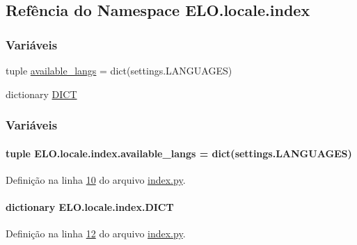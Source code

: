 \hypertarget{namespaceELO_1_1locale_1_1index}{}\subsection{Refência do Namespace E\+L\+O.\+locale.\+index}
\label{namespaceELO_1_1locale_1_1index}
\subsubsection*{Variáveis}
\begin{DoxyCompactItemize}
\item 
tuple \hyperlink{namespaceELO_1_1locale_1_1index_ab62adb4738ab68b1693adb90951d92a9}{available\+\_\+langs} = dict(settings.\+L\+A\+N\+G\+U\+A\+G\+E\+S)
\item 
dictionary \hyperlink{namespaceELO_1_1locale_1_1index_a065d26641ba89f86fe642e3858607087}{D\+I\+C\+T}
\end{DoxyCompactItemize}


\subsubsection{Variáveis}
\hypertarget{namespaceELO_1_1locale_1_1index_ab62adb4738ab68b1693adb90951d92a9}{}
\paragraph[{available\+\_\+langs}]{\setlength{\rightskip}{0pt plus 5cm}tuple E\+L\+O.\+locale.\+index.\+available\+\_\+langs = dict(settings.\+L\+A\+N\+G\+U\+A\+G\+E\+S)}\label{namespaceELO_1_1locale_1_1index_ab62adb4738ab68b1693adb90951d92a9}


Definição na linha \hyperlink{locale_2index_8py_source_l00010}{10} do arquivo \hyperlink{locale_2index_8py_source}{index.\+py}.

\hypertarget{namespaceELO_1_1locale_1_1index_a065d26641ba89f86fe642e3858607087}{}
\paragraph[{D\+I\+C\+T}]{\setlength{\rightskip}{0pt plus 5cm}dictionary E\+L\+O.\+locale.\+index.\+D\+I\+C\+T}\label{namespaceELO_1_1locale_1_1index_a065d26641ba89f86fe642e3858607087}


Definição na linha \hyperlink{locale_2index_8py_source_l00012}{12} do arquivo \hyperlink{locale_2index_8py_source}{index.\+py}.

